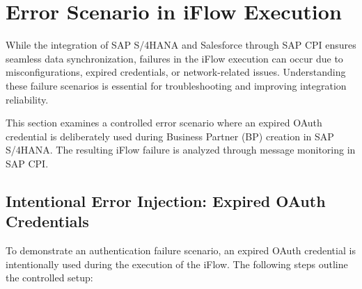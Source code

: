 \section{Error Scenario in iFlow Execution}

While the integration of SAP S/4HANA and Salesforce through SAP CPI ensures seamless data synchronization, failures in the iFlow execution can occur due to misconfigurations, expired credentials, or network-related issues. Understanding these failure scenarios is essential for troubleshooting and improving integration reliability. 

This section examines a controlled error scenario where an expired OAuth credential is deliberately used during Business Partner (BP) creation in SAP S/4HANA. The resulting iFlow failure is analyzed through message monitoring in SAP CPI.

\subsection{Intentional Error Injection: Expired OAuth Credentials}
To demonstrate an authentication failure scenario, an expired OAuth credential is intentionally used during the execution of the iFlow. The following steps outline the controlled setup:

